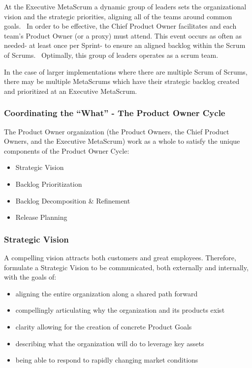 \documentclass[12pt,a4paper,parskip=full]{scrartcl}
\begin{document}
At the Executive MetaScrum a dynamic group of leaders sets the
organizational vision and the strategic priorities, aligning all of the
teams around common goals.~ In order to be effective, the Chief Product
Owner facilitates and each team's Product Owner (or a proxy) must
attend. This event occurs as often as needed- at least once per Sprint-
to ensure an aligned backlog within the Scrum of Scrums.~ Optimally,
this group of leaders operates as a scrum team.

In the case of larger implementations where there are multiple Scrum of
Scrums, there may be multiple MetaScrums which have their strategic
backlog created and prioritized at an Executive MetaScrum.

\subsubsection{Coordinating the ``What'' - The Product Owner
Cycle}\label{coordinating-the-what}

The Product Owner organization (the Product Owners, the Chief Product
Owners, and the Executive MetaScrum) work as a whole to satisfy the
unique components of the Product Owner Cycle:

\begin{itemize}
\itemsep1pt\parskip0pt
\item
  Strategic Vision
\item
  Backlog Prioritization
\item
  Backlog Decomposition \& Refinement
\item
  Release Planning
\end{itemize}

\subsubsection{Strategic Vision}\label{strategic-vision}

A compelling vision attracts both customers and great employees.
Therefore, formulate a Strategic Vision to be communicated, both
externally and internally, with the goals of:

\begin{itemize}
\itemsep1pt\parskip0pt
\item
  aligning the entire organization along a shared path forward
\item
  compellingly articulating why the organization and its products exist
\item
 clarity allowing for the creation of concrete Product Goals
\item
describing what the organization will do to leverage key assets
\item
being able to respond to rapidly changing market conditions
\end{itemize}
\end{document}
